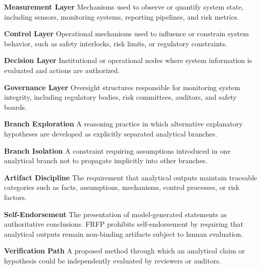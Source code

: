 \textbf{Measurement Layer}  
Mechanisms used to observe or quantify system state, including sensors,
monitoring systems, reporting pipelines, and risk metrics.

\textbf{Control Layer}  
Operational mechanisms used to influence or constrain system behavior,
such as safety interlocks, risk limits, or regulatory constraints.

\textbf{Decision Layer}  
Institutional or operational nodes where system information is evaluated
and actions are authorized.

\textbf{Governance Layer}  
Oversight structures responsible for monitoring system integrity,
including regulatory bodies, risk committees, auditors, and safety boards.

\textbf{Branch Exploration}  
A reasoning practice in which alternative explanatory hypotheses are
developed as explicitly separated analytical branches.

\textbf{Branch Isolation}  
A constraint requiring assumptions introduced in one analytical branch
not to propagate implicitly into other branches.

\textbf{Artifact Discipline}  
The requirement that analytical outputs maintain traceable categories
such as facts, assumptions, mechanisms, control processes, or risk factors.

\textbf{Self-Endorsement}  
The presentation of model-generated statements as authoritative conclusions.
FRFP prohibits self-endorsement by requiring that analytical outputs remain
non-binding artifacts subject to human evaluation.

\textbf{Verification Path}  
A proposed method through which an analytical claim or hypothesis could
be independently evaluated by reviewers or auditors.
